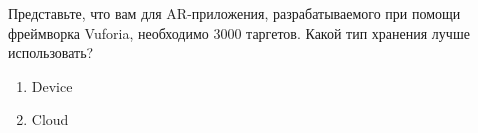 
Представьте, что вам для AR-приложения, разрабатываемого при помощи фреймворка Vuforia, необходимо 3000 таргетов. Какой тип хранения лучше использовать?

\begin{enumerate}
    \item Device
    \item Cloud
\end{enumerate}